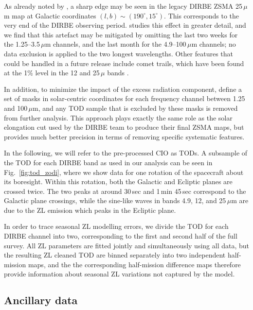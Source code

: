 \documentclass[twocolumn]{aa}
\begin{document}
As already noted by \citet{Kelsall1998}, a sharp edge may be seen in
the legacy DIRBE ZSMA 25\,$\mu$m map at Galactic coordinates
$(l,b)\sim(190^{\circ},15^{\circ})$. This corresponds to the very end
of the DIRBE observing period. \citet{CG02_01} studies this effect in
greater detail, and we find that this artefact may be mitigated by
omitting the last two weeks for the 1.25--3.5\,$\mu$m channels, and
the last month for the 4.9--100$\,\mu$m channels; no data exclusion is
applied to the two longest wavelengths. Other  features that could be handled in a future release include comet trails, which have been found at the 1\% level in the 12 and 25\,$\mu$ bands \citep{arendt}.




In addition, to minimize the impact of the excess radiation component,
\citet{CG02_01} define a set of masks in solar-centric coordinates for
each frequency channel between 1.25 and 100\,$\mu$m, and any TOD
sample that is excluded by these masks is removed from further
analysis. This approach plays exactly the same role as the solar
elongation cut used by the DIRBE team to produce their final ZSMA
maps, but provides much better precision in terms of removing specific
systematic features.

In the following, we will refer to the pre-processed CIO as TODs.  A
subsample of the TOD for each DIRBE band as used in our analysis can
be seen in Fig.~\ref{fig:tod_zodi}, where we show data for one
rotation of the spacecraft about its boresight. Within this rotation,
both the Galactic and Ecliptic planes are crossed twice. The two peaks
at around 30\,sec and 1\,min 45\,sec correspond to the Galactic plane
crossings, while the sine-like waves in bands 4.9, 12, and 25\,$\mu$m
are due to the ZL emission which peaks in the Ecliptic plane.

In order to trace seasonal ZL modelling errors, we divide the TOD for
each DIRBE channel into two, corresponding to the first and second
half of the full survey. All ZL parameters are fitted jointly and
simultaneously using all data, but the resulting ZL cleaned TOD are
binned separately into two independent half-mission maps, and the the
corresponding half-mission difference maps therefore provide
information about seasonal ZL variations not captured by the model.

\subsection{Ancillary data}
\end{document}
